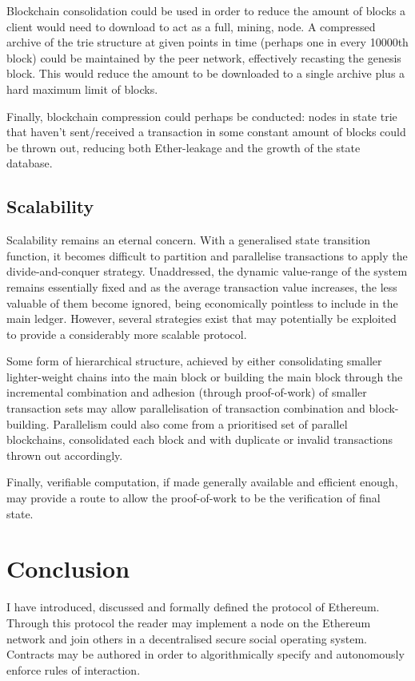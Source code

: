 \documentclass[9pt,oneside]{amsart}
\begin{document}
\begin{multicols}{2}
Blockchain consolidation could be used in order to reduce the amount of blocks a client would need to download to act as a full, mining, node. A compressed archive of the trie structure at given points in time (perhaps one in every 10000th block) could be maintained by the peer network, effectively recasting the genesis block. This would reduce the amount to be downloaded to a single archive plus a hard maximum limit  of blocks.

Finally, blockchain compression could perhaps be conducted: nodes in state trie that haven't sent/received a transaction in some constant amount of blocks could be thrown out, reducing both Ether-leakage and the growth of the state database.

\subsection{Scalability}

Scalability remains an eternal concern. With a generalised state transition function, it becomes difficult to partition and parallelise transactions to apply the divide-and-conquer strategy. Unaddressed, the dynamic value-range of the system remains essentially fixed and as the average transaction value increases, the less valuable of them become ignored, being economically pointless to include in the main ledger. However, several strategies exist that may potentially be exploited to provide a considerably more scalable protocol.

Some form of hierarchical structure, achieved by either consolidating smaller lighter-weight chains into the main block or building the main block through the incremental combination and adhesion (through proof-of-work) of smaller transaction sets may allow parallelisation of transaction combination and block-building. Parallelism could also come from a prioritised set of parallel blockchains, consolidated each block and with duplicate or invalid transactions thrown out accordingly.

Finally, verifiable computation, if made generally available and efficient enough, may provide a route to allow the proof-of-work to be the verification of final state.

\section{Conclusion} \label{ch:conclusion}

I have introduced, discussed and formally defined the protocol of Ethereum. Through this protocol the reader may implement a node on the Ethereum network and join others in a decentralised secure social operating system. Contracts may be authored in order to algorithmically specify and autonomously enforce rules of interaction.


\end{multicols}
\end{document}
